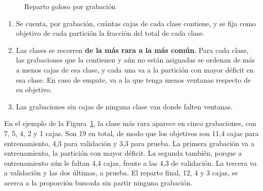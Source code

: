 \begin{figure}[htbp]
    \centering
    \caption{Reparto goloso por grabación}
    \label{fig:reparto}
\end{figure}

\begin{enumerate}
    \item Se cuenta, por grabación, cuántas cajas de cada clase contiene, y se
          fija como objetivo de cada partición la fracción \splitRatios{} del total
          de cada clase.
    \item Las clases se recorren \textbf{de la más rara a la más común}. Para cada
          clase, las grabaciones que la contienen y aún no están asignadas se ordenan
          de más a menos cajas de esa clase, y cada una va a la partición con mayor
          déficit en esa clase. En caso de empate, va a la que tenga menos
          ventanas respecto de su objetivo.
    \item Las grabaciones sin cajas de ninguna clase van donde falten ventanas.
\end{enumerate}

En el ejemplo de la Figura~\ref{fig:reparto}, la clase más rara aparece en cinco
grabaciones, con 7, 5, 4, 2 y 1 cajas. Son 19 en total, de modo que los objetivos
son 11,4 cajas para entrenamiento, 4,3 para validación y 3,3 para prueba. La
primera grabación va a entrenamiento, la partición con mayor déficit. La segunda
también, porque a entrenamiento aún le faltan 4,4 cajas, frente a las 4,3 de
validación. La tercera va a validación y las dos últimas, a prueba. El reparto
final, 12, 4 y 3 cajas, se acerca a la proporción buscada sin partir ninguna
grabación.

